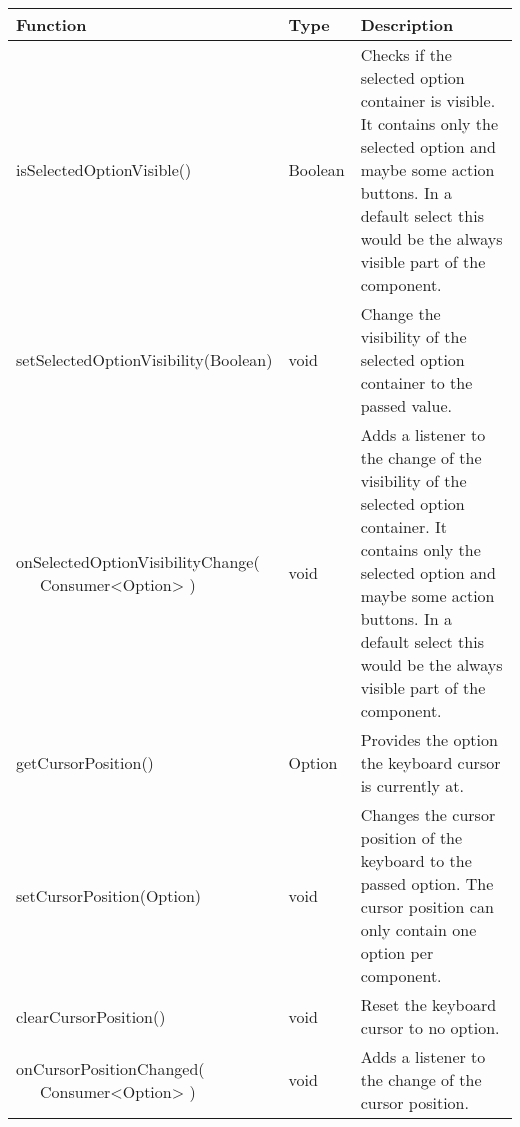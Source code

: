 \clearpage
\begin{table}[!htb] 
    \label{api:selectControllerReturn2}
    \scriptsize
    \setlength\extrarowheight{4pt}
    \begin{tabular}{ p{5cm} p{2.3cm} p{5.2cm} }
        \toprule[0.5pt]
        \textbf{Function}                    & \textbf{Type}          & \textbf{Description} \\
        \midrule    
        isSelectedOptionVisible()            & Boolean                & Checks if the selected option container is visible. 
                                                                        It contains only the selected option and maybe some action buttons. 
                                                                        In a default select this would be the always visible part of the component. \\
        setSelectedOptionVisibility(Boolean) & void                   & Change the visibility of the selected option container to the passed value. \\
        \tbbr{
            onSelectedOptionVisibilityChange( \\
                \ \ \ Consumer<Option>
            )}                               & void                   & Adds a listener to the change of the visibility of the selected option container. 
                                                                        It contains only the selected option and maybe some action buttons. 
                                                                        In a default select this would be the always visible part of the component. \\
        getCursorPosition()                  & Option                 & Provides the option the keyboard cursor is currently at. \\
        setCursorPosition(Option)            & void                   & Changes the cursor position of the keyboard to the passed option. 
                                                                        The cursor position can only  contain one option per component. \\
        clearCursorPosition()                & void                   & Reset the keyboard cursor to no option. \\
        \tbbr{
            onCursorPositionChanged( \\
                \ \ \ Consumer<Option>
            )}                               & void                   & Adds a listener to the change of the cursor position. \\

\end{tabular}
\end{table}
